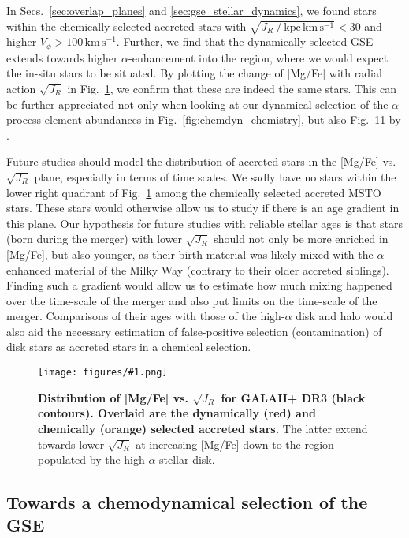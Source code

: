 \documentclass[fleqn,usenatbib]{mnras}
\newcommand{\codeicon}{{\faCloudDownload}}
\newcommand{\codelink}[1]{\href{https://github.com/svenbuder/buder_galah_accreted_chemistry/tree/main/figures/#1.ipynb}{\codeicon}\,\,}
\newcommand{\oscaption}[2]{\caption{#2 \codelink{#1}}}
\newcommand{\figurecolumnwidth}[3]{\begin{figure} \centering \texttt{[image: figures/\#1.png]}\oscaption{#2}{#3}\label{fig:#1} \end{figure}}
\begin{document}
In Secs.~\ref{sec:overlap_planes} and \ref{sec:gse_stellar_dynamics}, we found stars within the chemically selected accreted stars with $\sqrt{J_R~/~\mathrm{kpc\,km\,s^{-1}}} < 30$ and higher $V_\phi > 100\,\mathrm{km\,s^{-1}}$. Further, we find that the dynamically selected GSE extends towards higher $\alpha$-enhancement into the region, where we would expect the in-situ stars to be situated. By plotting the change of [Mg/Fe] with radial action $\sqrt{J_R}$ in Fig.~\ref{fig:overlap_mgfe_sqrtjr}, we confirm that these are indeed the same stars. This can be further appreciated not only when looking at our dynamical selection of the $\alpha$-process element abundances in Fig.~\ref{fig:chemdyn_chemistry}, but also Fig.~11 by \citet{Naidu2020}.

Future studies should model the distribution of accreted stars in the [Mg/Fe] vs. $\sqrt{J_R}$ plane, especially in terms of time scales. We sadly have no stars within the lower right quadrant of Fig.~\ref{fig:overlap_mgfe_sqrtjr} among the chemically selected accreted MSTO stars. These stars would otherwise allow us to study if there is an age gradient in this plane. Our hypothesis for future studies with reliable stellar ages is that stars (born during the merger) with lower $\sqrt{J_R}$ should not only be more enriched in [Mg/Fe], but also younger, as their birth material was likely mixed with the $\alpha$-enhanced material of the Milky Way (contrary to their older accreted siblings). Finding such a gradient would allow us to estimate how much mixing happened over the time-scale of the merger and also put limits on the time-scale of the merger. Comparisons of their ages with those of the high-$\alpha$ disk and halo would also aid the necessary estimation of false-positive selection (contamination) of disk stars as accreted stars in a chemical selection.

\figurecolumnwidth{overlap_mgfe_sqrtjr}{chronochemodynamic_comparison}{
\textbf{Distribution of [Mg/Fe] vs. $\sqrt{J_R}$ for GALAH+ DR3 (black contours). Overlaid are the dynamically (red) and chemically (orange) selected accreted stars.} The latter extend towards lower $\sqrt{J_R}$ at increasing [Mg/Fe] down to the region populated by the high-$\alpha$ stellar disk.
}

\subsection{Towards a chemodynamical selection of the GSE} \label{sec:towards_chemodyn}
\end{document}
